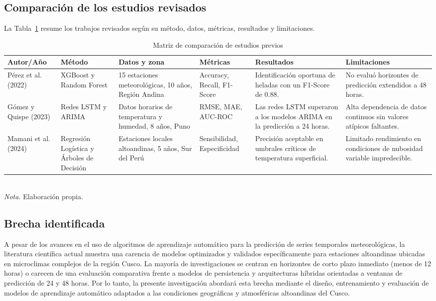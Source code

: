 \subsection{Comparación de los estudios revisados}
La Tabla~\ref{tab:matrizarte} resume los trabajos revisados según su método, datos, métricas, resultados y limitaciones.

\begin{table}[ht]
\centering
\caption{Matriz de comparación de estudios previos}
\label{tab:matrizarte}
\footnotesize
\setlength{\tabcolsep}{3pt}
\begin{tabular}{@{}p{2cm}p{2.6cm}p{2.6cm}p{2.4cm}p{2.6cm}p{2.6cm}@{}}
\toprule
\textbf{Autor/Año} & \textbf{Método} & \textbf{Datos y zona} & \textbf{Métricas} & \textbf{Resultados} & \textbf{Limitaciones} \\
\midrule
Pérez et al. (2022) & XGBoost y Random Forest & 15 estaciones meteorológicas, 10 años, Región Andina & Accuracy, Recall, F1-Score & Identificación oportuna de heladas con un F1-Score de 0.88. & No evaluó horizontes de predicción extendidos a 48 horas. \\
\midrule
Gómez y Quispe (2023) & Redes LSTM y ARIMA & Datos horarios de temperatura y humedad, 8 años, Puno & RMSE, MAE, AUC-ROC & Las redes LSTM superaron a los modelos ARIMA en la predicción a 24 horas. & Alta dependencia de datos continuos sin valores atípicos faltantes. \\
\midrule
Mamani et al. (2024) & Regresión Logística y Árboles de Decisión & Estaciones locales altoandinas, 5 años, Sur del Perú & Sensibilidad, Especificidad & Precisión aceptable en umbrales críticos de temperatura superficial. & Limitado rendimiento en condiciones de nubosidad variable impredecible. \\
\bottomrule
\end{tabular}\\
\textit{Nota.} Elaboración propia.
\end{table}

\subsection{Brecha identificada}
A pesar de los avances en el uso de algoritmos de aprendizaje automático para la predicción de series temporales meteorológicas, la literatura científica actual muestra una carencia de modelos optimizados y validados específicamente para estaciones altoandinas ubicadas en microclimas complejos de la región Cusco. La mayoría de investigaciones se centran en horizontes de corto plazo inmediato (menos de 12 horas) o carecen de una evaluación comparativa frente a modelos de persistencia y arquitecturas híbridas orientadas a ventanas de predicción de 24 y 48 horas. Por lo tanto, la presente investigación abordará esta brecha mediante el diseño, entrenamiento y evaluación de modelos de aprendizaje automático adaptados a las condiciones geográficas y atmosféricas altoandinas del Cusco.